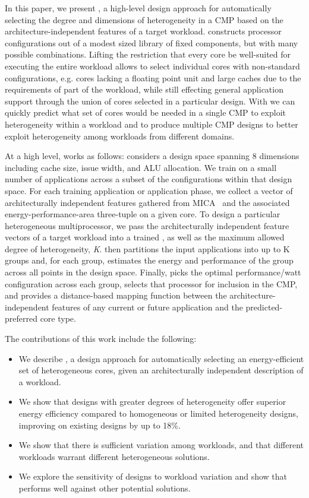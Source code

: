 In this paper, we present \blackBox{}, a high-level design approach
for automatically selecting the degree and dimensions of heterogeneity
in a CMP based on the architecture-independent features of a target
workload. \blackBox{} constructs processor configurations out of a
modest sized library of fixed components, but with many possible
combinations. Lifting the restriction that every core be well-suited
for executing the entire workload allows \blackBox{} to select
individual cores with non-standard configurations, e.g. cores lacking
a floating point unit and large caches due to the requirements of part
of the workload, while still effecting general application support through the union of
cores selected in a particular design. With \blackBox{} we can quickly
predict what set of cores would be needed in a single CMP to exploit
heterogeneity within a workload and to produce multiple CMP designs to
better exploit heterogeneity among workloads from different domains.

At a high level, \blackBox{} works as follows: \blackBox{} considers a
design space spanning 8 dimensions including cache
size, issue width, and ALU allocation. We train on a small number
of applications across a subset of the configurations within that
design space. For each training application or application phase, we
collect a vector of architecturally independent features
gathered from MICA~\cite{Hoste07-IEEEMICRO-MICA} and the associated
energy-performance-area three-tuple on a given core. To design a
particular heterogeneous multiprocessor, we pass the architecturally
independent feature vectors of a target workload into a trained
\blackBox{}, as well as the maximum allowed degree of heterogeneity,
\textit{K}. \blackBox{} then partitions the input applications into up
to K groups and, for each group, estimates the energy and performance
of the group across all points in the design space. Finally,
\blackBox{} picks the optimal performance/watt configuration across
each group, selects that processor for inclusion in the CMP, and
provides a distance-based mapping function between the
architecture-independent features of any current or future application
and the predicted-preferred core type.

The contributions of this work include the following:
\begin{itemize}
\item We describe \blackBox{}, a design approach for automatically
  selecting an energy-efficient set of heterogeneous cores, given an
  architecturally independent description of a workload.
\item We show that \blackBox{} designs with greater degrees of
  heterogeneity offer superior energy efficiency compared to
  homogeneous or limited heterogeneity designs, improving on existing
  designs by up to 18\%.
\item We show that there is sufficient variation among workloads, and that
  different workloads warrant different heterogeneous solutions.
\item We explore the sensitivity of \blackBox{} designs to workload
  variation and show that \Ravan{} performs well against other potential
  solutions.
\end{itemize}


